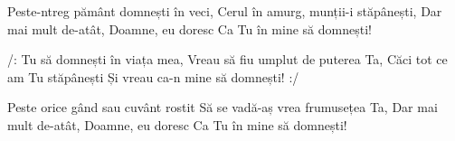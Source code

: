 \beginverse
Peste-ntreg pământ domnești în veci,
Cerul în amurg, munții-i stăpânești,
Dar mai mult de-atât, Doamne, eu doresc
Ca Tu în mine să domnești!
\endverse

\beginchorus
/: Tu să domnești în viața mea,
Vreau să fiu umplut de puterea Ta,
Căci tot ce am Tu stăpânești
Și vreau ca-n mine să domnești! :/
\endchorus

\beginverse
Peste orice gând sau cuvânt rostit
Să se vadă-aș vrea frumusețea Ta,
Dar mai mult de-atât, Doamne, eu doresc
Ca Tu în mine să domnești!
\endverse
\endsong